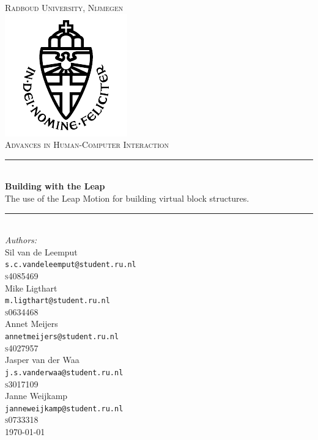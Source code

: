 \newcommand{\HRule}{\rule{\linewidth}{0.5mm}}

\begin{titlepage}

\begin{center}



\textsc{\LARGE Radboud University, Nijmegen}\\

\includegraphics[scale=0.8]{imgs/rulogo.png}\\[1cm]

\textsc{\Large Advances in Human-Computer Interaction}\\[0.5cm]



\HRule \\[0.4cm]
{ \huge \bfseries Building with the Leap}\\[0.3cm]
{\Large The use of the Leap Motion for building virtual block structures.}

\HRule \\[1cm]

{\large \emph{Authors:}\\[0.2cm]
Sil van de Leemput\\
\texttt{s.c.vandeleemput@student.ru.nl}\\[0.08cm]
\textsc{s4085469}\\[0.5cm]
Mike Ligthart\\
\texttt{m.ligthart@student.ru.nl}\\[0.08cm]
\textsc{s0634468}\\[0.5cm]
Annet Meijers\\
\texttt{annetmeijers@student.ru.nl}\\[0.08cm]
\textsc{s4027957}\\[0.5cm]
Jasper van der Waa\\
\texttt{j.s.vanderwaa@student.ru.nl}\\[0.08cm]
\textsc{s3017109}\\[0.5cm]
Janne Weijkamp\\
\texttt{janneweijkamp@student.ru.nl}\\[0.08cm]
\textsc{s0733318}}\\[2cm]
\today
\end{center}

\end{titlepage}